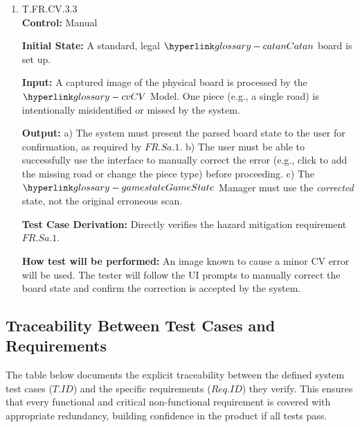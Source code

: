 \documentclass[12pt, titlepage]{article}
\begin{document}
\begin{enumerate}
\item{T.FR.CV.3.3\\}
\textbf{Control:} Manual

\textbf{Initial State:} A standard, legal $\Catan{}$ board is set up.

\textbf{Input:} A captured image of the physical board is processed by the $\CV{}$ Model. One piece (e.g., a single road) is intentionally misidentified or missed by the system.

\textbf{Output:}
a) The system must present the parsed board state to the user for confirmation, as required by $\hyperref[FR.Sa.1]{FR.Sa.1}$\textsuperscript{}.
b) The user must be able to successfully use the interface to manually correct the error (e.g., click to add the missing road or change the piece type) before proceeding.
c) The $\GameState{}$ Manager must use the \textit{corrected} state, not the original erroneous scan.

\textbf{Test Case Derivation:} Directly verifies the hazard mitigation requirement $\hyperref[FR.Sa.1]{FR.Sa.1}$\textsuperscript{}.

\textbf{How test will be performed:} An image known to cause a minor CV error will be used. The tester will follow the UI prompts to manually correct the board state and confirm the correction is accepted by the system.

\end{enumerate}


\subsection{Traceability Between Test Cases and Requirements}

The table below documents the explicit traceability between the defined system test cases ($\mathit{T.ID}$) and the specific requirements ($\mathit{Req.ID}$) they verify. This ensures that every functional and critical non-functional requirement is covered with appropriate redundancy, building confidence in the product if all tests pass.
\end{document}
